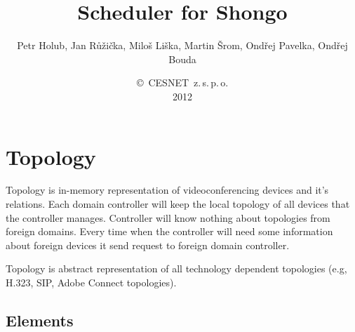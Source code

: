 \documentclass[a4paper]{report}
\begin{document}
\title{Scheduler for Shongo}
\author{Petr Holub, Jan Růžička, Miloš Liška, Martin Šrom, Ondřej Pavelka, Ondřej Bouda}
\date{\copyright~CESNET~z.\,s.\,p.\,o.\\2012}
\maketitle
\tableofcontents


\chapter{Topology}

Topology is in-memory representation of videoconferencing devices and it's relations. Each domain controller will keep the local topology of all devices that the controller manages.
Controller will know nothing about topologies from foreign domains. Every time when the controller will need some information about foreign devices it send request to foreign domain controller.

Topology is abstract representation of all technology dependent topologies (e.g, H.323, SIP, Adobe Connect topologies).


\section{Elements}
\end{document}
